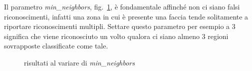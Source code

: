 \documentclass[a4paper,11pt]{article}
\begin{document}
Il parametro \emph{min\_neighbors}, fig.~\ref{fig:minneigh}, è
fondamentale affinché non ci siano falsi riconoscimenti, infatti una
zona in cui è presente una faccia tende solitamente a riportare
riconoscimenti multipli. Settare questo parametro per esempio a 3
significa che viene riconosciuto un volto qualora ci siano almeno 3
regioni sovrapposte classificate come tale.

\begin{figure}[htbp]
  \centering
  \hspace{2mm}
  \caption{risultati al variare di \emph{min\_neighbors}}
  \label{fig:minneigh}
\end{figure}
\end{document}
